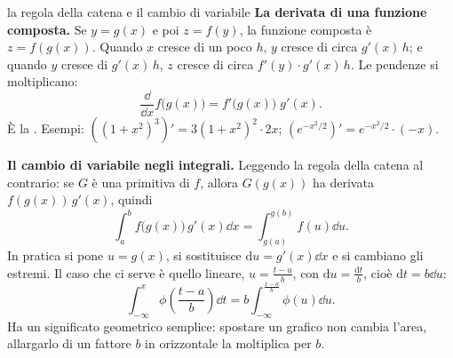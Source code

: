 \begin{richiamo}{la regola della catena e il cambio di variabile}
\textbf{La derivata di una funzione composta.} Se $y = g(x)$ e poi $z = f(y)$, la funzione composta è $z = f(g(x))$.
Quando $x$ cresce di un poco $h$, $y$ cresce di circa $g'(x)\,h$; e quando $y$ cresce di $g'(x)\,h$, $z$ cresce di
circa $f'(y) \cdot g'(x)\,h$. Le pendenze si moltiplicano:
\[ \frac{\dd}{\dd x} f\big(g(x)\big) = f'\big(g(x)\big)\; g'(x) . \]
È la . Esempi: $\left( (1 + x^2)^3 \right)' = 3 (1 + x^2)^2 \cdot 2x$;
$\left( e^{-x^2/2} \right)' = e^{-x^2/2} \cdot (-x)$.

\textbf{Il cambio di variabile negli integrali.} Leggendo la regola della catena al contrario: se $G$ è una primitiva di
$f$, allora $G(g(x))$ ha derivata $f(g(x))\, g'(x)$, quindi
\[ \int_a^b f\big(g(x)\big)\, g'(x) \dd x = \int_{g(a)}^{g(b)} f(u) \dd u . \]
In pratica si pone $u = g(x)$, si sostituisce $\mathrm{d}u = g'(x) \dd x$ e si cambiano gli estremi. Il caso che ci
serve è quello lineare, $u = \frac{t - a}{b}$, con $\mathrm{d}u = \frac{\mathrm{d}t}{b}$, cioè $\mathrm{d}t = b \dd u$:
\[ \int_{-\infty}^{x} \phi\left( \frac{t - a}{b} \right) \dd t = b \int_{-\infty}^{\frac{x - a}{b}} \phi(u) \dd u . \]
Ha un significato geometrico semplice: spostare un grafico non cambia l'area, allargarlo di un fattore $b$ in
orizzontale la moltiplica per $b$.
\end{richiamo}

